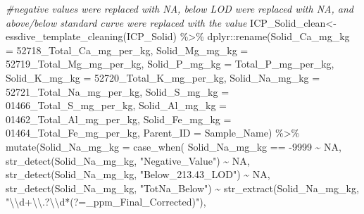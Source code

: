\documentclass[
]{article}
\newenvironment{Shaded}{\begin{snugshade}}{\end{snugshade}}
\newcommand{\AttributeTok}[1]{\textcolor[rgb]{0.77,0.63,0.00}{#1}}
\newcommand{\CommentTok}[1]{\textcolor[rgb]{0.56,0.35,0.01}{\textit{#1}}}
\newcommand{\ConstantTok}[1]{\textcolor[rgb]{0.00,0.00,0.00}{#1}}
\newcommand{\DecValTok}[1]{\textcolor[rgb]{0.00,0.00,0.81}{#1}}
\newcommand{\FunctionTok}[1]{\textcolor[rgb]{0.00,0.00,0.00}{#1}}
\newcommand{\NormalTok}[1]{#1}
\newcommand{\OtherTok}[1]{\textcolor[rgb]{0.56,0.35,0.01}{#1}}
\newcommand{\SpecialCharTok}[1]{\textcolor[rgb]{0.00,0.00,0.00}{#1}}
\newcommand{\StringTok}[1]{\textcolor[rgb]{0.31,0.60,0.02}{#1}}
\begin{document}
\begin{Shaded}
\begin{Highlighting}[]
\CommentTok{\#negative values were replaced with NA, below LOD were replaced with NA, and above/below standard curve were replaced with the value}
\NormalTok{ICP\_Solid\_clean}\OtherTok{\textless{}{-}} \FunctionTok{essdive\_template\_cleaning}\NormalTok{(ICP\_Solid) }\SpecialCharTok{\%\textgreater{}\%}
\NormalTok{  dplyr}\SpecialCharTok{::}\FunctionTok{rename}\NormalTok{(}\AttributeTok{Solid\_Ca\_mg\_kg =} \StringTok{\textquotesingle{}52718\_Total\_Ca\_mg\_per\_kg\textquotesingle{}}\NormalTok{,}
                \AttributeTok{Solid\_Mg\_mg\_kg =} \StringTok{\textquotesingle{}52719\_Total\_Mg\_mg\_per\_kg\textquotesingle{}}\NormalTok{,}
                \AttributeTok{Solid\_P\_mg\_kg =} \StringTok{\textquotesingle{}Total\_P\_mg\_per\_kg\textquotesingle{}}\NormalTok{,}
                \AttributeTok{Solid\_K\_mg\_kg =} \StringTok{\textquotesingle{}52720\_Total\_K\_mg\_per\_kg\textquotesingle{}}\NormalTok{,}
                \AttributeTok{Solid\_Na\_mg\_kg =} \StringTok{\textquotesingle{}52721\_Total\_Na\_mg\_per\_kg\textquotesingle{}}\NormalTok{,}
                \AttributeTok{Solid\_S\_mg\_kg =} \StringTok{\textquotesingle{}01466\_Total\_S\_mg\_per\_kg\textquotesingle{}}\NormalTok{,}
                \AttributeTok{Solid\_Al\_mg\_kg =} \StringTok{\textquotesingle{}01462\_Total\_Al\_mg\_per\_kg\textquotesingle{}}\NormalTok{,}
                \AttributeTok{Solid\_Fe\_mg\_kg =} \StringTok{\textquotesingle{}01464\_Total\_Fe\_mg\_per\_kg\textquotesingle{}}\NormalTok{,}
                \AttributeTok{Parent\_ID =} \StringTok{\textquotesingle{}Sample\_Name\textquotesingle{}}\NormalTok{) }\SpecialCharTok{\%\textgreater{}\%}
  \FunctionTok{mutate}\NormalTok{(}\AttributeTok{Solid\_Na\_mg\_kg =} \FunctionTok{case\_when}\NormalTok{(}
\NormalTok{                Solid\_Na\_mg\_kg }\SpecialCharTok{==} \SpecialCharTok{{-}}\DecValTok{9999} \SpecialCharTok{\textasciitilde{}} \ConstantTok{NA}\NormalTok{,}
                \FunctionTok{str\_detect}\NormalTok{(Solid\_Na\_mg\_kg, }\StringTok{"Negative\_Value"}\NormalTok{) }\SpecialCharTok{\textasciitilde{}} \ConstantTok{NA}\NormalTok{, }
                \FunctionTok{str\_detect}\NormalTok{(Solid\_Na\_mg\_kg, }\StringTok{"Below\_213.43\_LOD"}\NormalTok{) }\SpecialCharTok{\textasciitilde{}} \ConstantTok{NA}\NormalTok{, }
                \FunctionTok{str\_detect}\NormalTok{(Solid\_Na\_mg\_kg, }\StringTok{"TotNa\_Below"}\NormalTok{) }\SpecialCharTok{\textasciitilde{}} 
                \FunctionTok{str\_extract}\NormalTok{(Solid\_Na\_mg\_kg, }\StringTok{"}\SpecialCharTok{\textbackslash{}\textbackslash{}}\StringTok{d+}\SpecialCharTok{\textbackslash{}\textbackslash{}}\StringTok{.?}\SpecialCharTok{\textbackslash{}\textbackslash{}}\StringTok{d*(?=\_ppm\_Final\_Corrected)"}\NormalTok{),}

\end{Highlighting}
\end{Shaded}
\end{document}

